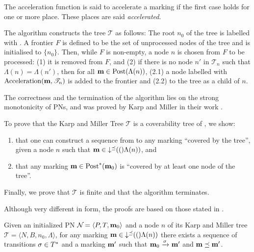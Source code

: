 The acceleration function is said to accelerate a marking if the first case holds for one or more place.
These places are said \emph{accelerated}.


The algorithm constructs the tree $\mathcal{T}$ as follows:
The root $n_0$ of the tree is labelled with \mari.
A frontier $F$ is defined to be the set of unprocessed nodes of the tree and is initialised to $\{n_0\}$.
Then, while $F$ is non-empty, a node $n$ is chosen from $F$ to be processed:
(1) it is removed from $F$, and (2) if there is no node $n'$ in $\mathscr{T}_n$ such that $\Lambda(n) = \Lambda(n')$, then for all \omark $\mathbf{m} \in \operatorname{Post}(\Lambda(n))$, (2.1) a node labelled with $\operatorname{Acceleration}(\mathbf{m}, \mathscr{T}_n)$ is added to the frontier and (2.2) to the tree as a child of $n$.

The correctness and the termination of the algorithm lies on the strong monotonicity of \acp{PN}, and was proved by Karp and Miller in their work \cite{Karp69}.

To prove that the Karp and Miller Tree $\mathcal T$ is a coverability tree of \namePN, we show:
\begin{enumerate}
  \item \todo{} that one can construct a sequence from \mari to any marking \mar “covered by the tree”, given a node $n$ such that $\mathbf{m} \in \operatorname{\downarrow^\preceq}(()\Lambda(n))$, and
  \item \todo{} that any marking $\mathbf{m} \in \operatorname{Post}^*(\mathbf{m}_0)$ is “covered by at least one node of the tree”.
\end{enumerate}

\todo{} Finally, we prove that $\mathcal{T}$ is finite and that the algorithm terminates.

Although very different in form, the proofs are based on those stated in \cite{Karp69}.

\begin{lemm}
  Given an initialized \ac{PN} $\mathcal{N}_{} = \langle P,T, \mathbf{m}_0\rangle$ and a node $n$ of its Karp and Miller tree $\mathcal{T} = \langle N, B, n_0, \Lambda\rangle$,
  for any marking $\mathbf{m} \in \operatorname{\downarrow^\preceq}(()\Lambda(n))$ there exists a sequence of transitions $\seqt \in T^*$ and a marking $\mathbf{m}'$ such that $\mari \fire{\seqt} \mar'$ and $\mathbf{m} \preceq \mathbf{m}'$.
\end{lemm}

